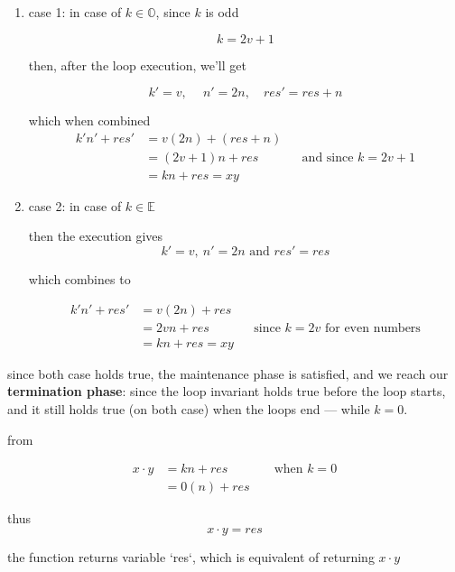 \documentclass{article}
\theoremstyle{remark}
\begin{document}
\begin{enumerate}
    \item case 1: in case of \(k \in \mathbb{O}\), since \(k\) is odd

    \[
    k = 2v + 1
    \]

    then, after the loop execution, we'll get

    \[
    k' = v, \quad \ n' = 2n, \quad res' = res + n
    \]

    which when combined
    \[
    \begin{aligned}
    k'n' + res' &= v(2n) + (res + n) \\
                &= (2v + 1)n + res && \text{and since } k = 2v + 1\\
                &= kn + res = xy
    \end{aligned}
    \]

    \item case 2: in case of \(k \in \mathbb{E}\)

    then the execution gives
    \[
    k' = v,\ n' = 2n \text{ and } res' = res
    \]

    which combines to

    \[
    \begin{aligned}
    k'n' + res' &= v(2n) + res \\
                &= 2vn + res && \text{since } k = 2v \text{ for even numbers}\\
                &= kn + res = xy
    \end{aligned}
    \]

\end{enumerate}

since both case holds true, the maintenance phase is satisfied, and we reach our \textbf{termination phase}: since the loop invariant holds true before the loop starts, and it still holds true (on both case) when the loops end --- while \(k = 0\).

\vspace{1em}

from

\[
\begin{aligned}
    x \cdot y &= kn + res && \text{ when } k = 0 \\
    &= 0(n) + res
\end{aligned}
\]

thus
\[
x \cdot y = res
\]

the function returns variable `res`, which is equivalent of returning \(x \cdot y\)

\vspace{1em}
\hrulefill
\end{document}
